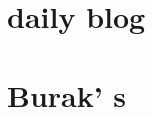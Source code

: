 \documentclass[aip,cha,
reprint,
secnumarabic,
nofootinbib, tightenlines,
nobibnotes, showkeys, showpacs,
groupedaddress,
]{revtex4-1}
\begin{document}
    \newpage
    \section{{\twoMode} daily blog}
    \label{chap:2modes}

    \newpage
    \section{Burak' s {\twoMode}}
    \label{chap:2modesBB}



\fi
\end{document}
